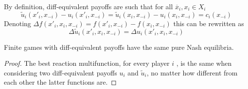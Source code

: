 \documentclass[../main.tex]{subfiles}
\begin{document}
By definition, diff-equivalent payoffs are such that for all $\overline{x}_i ,x_i \in X_i$
\[
    \tilde{u}_i(x'_i, x_{-i}) - u_i(x'_i, x_{-i}) = \tilde{u}_i(x_i, x_{-i}) - u_i(x_i, x_{-i}) = c_i(x_{-i})
\]
Denoting $\Delta f(x'_i, x_i, x_{-i}) = f(x'_i, x_{-i}) - f(x_i, x_{-i})$ this can be rewritten as
\[
    \Delta \tilde{u}_i(x'_i, x_i, x_{-i}) = \Delta u_i(x'_i, x_i, x_{-i})
\]
\begin{theorem}
    Finite games with diff-equivalent payoffs have the same pure Nash equilibria.
\end{theorem}
\begin{proof}
    The best reaction multifunction, for every player $i$ , is the same when considering two diff-equivalent payoffs $u_i$ and $\tilde{u}_i$, no matter how different from each other the latter functions are.
\end{proof}
\newpage
\end{document}
